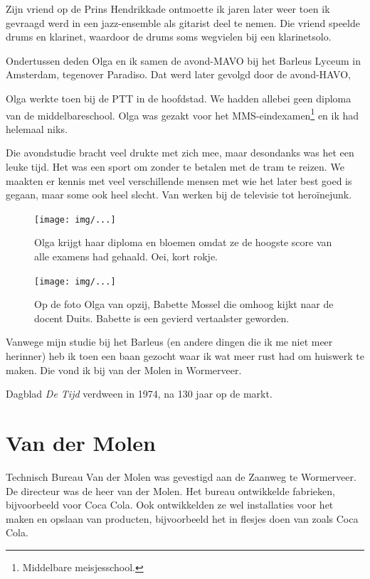 \documentclass[12pt,twoside]{memoir}
\begin{document}
Zijn vriend op de Prins Hendrikkade ontmoette ik jaren later weer toen ik gevraagd werd in een jazz-ensemble als gitarist deel te nemen. Die vriend speelde drums en klarinet, waardoor  de drums soms wegvielen bij een klarinetsolo.

Ondertussen deden Olga en ik samen de avond-MAVO bij het Barleus Lyceum in Amsterdam, tegenover Paradiso. Dat werd later gevolgd door de avond-HAVO,

Olga werkte toen bij de PTT in de hoofdstad. We hadden allebei geen diploma van de middelbareschool. Olga was gezakt voor het MMS-eindexamen\footnote{Middelbare meisjesschool.} en ik had helemaal niks.

Die avondstudie bracht veel drukte met zich mee, maar desondanks was het een leuke tijd. Het was een sport om zonder te betalen met de tram te reizen. We maakten er kennis met veel verschillende mensen met wie het later best goed is gegaan, maar some ook heel slecht. Van werken bij de televisie tot heroïnejunk.

\begin{figure}[t]
\texttt{[image: img/...]}
\caption{Olga krijgt haar diploma en bloemen omdat ze de hoogste score van alle examens had gehaald. Oei, kort rokje.}
\end{figure}

\begin{figure}[t]
\texttt{[image: img/...]}
\caption{Op de foto Olga van opzij, Babette Mossel die omhoog kijkt naar de docent Duits. Babette is een gevierd vertaalster geworden.}
\end{figure}

Vanwege mijn studie bij het Barleus (en andere dingen die ik me niet meer herinner) heb ik toen een baan gezocht waar ik wat meer rust had om huiswerk te maken. Die vond ik bij van der Molen in Wormerveer.

Dagblad \emph{De Tijd} verdween in 1974, na 130 jaar op de markt.

\chapter{Van der Molen} %
\label{cha:vandermolen}

Technisch Bureau Van der Molen was gevestigd aan de Zaanweg te Wormerveer. De directeur was de heer van der Molen. Het bureau ontwikkelde fabrieken, bijvoorbeeld voor Coca Cola. Ook ontwikkelden ze wel installaties voor het maken en opslaan van producten, bijvoorbeeld het in flesjes doen van zoals Coca Cola. 
\end{document}
